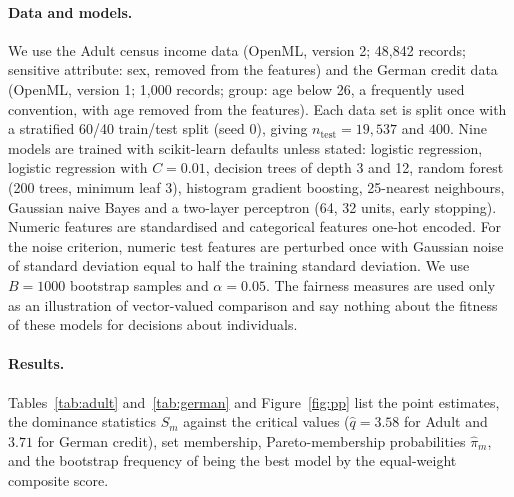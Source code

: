 \documentclass[11pt,a4paper]{article}
\begin{document}
\paragraph{Data and models.} We use the Adult census income data (OpenML, version 2; 48,842 records; sensitive attribute: sex, removed from the features) and the German credit data (OpenML, version 1; 1,000 records; group: age below 26, a frequently used convention, with age removed from the features). Each data set is split once with a stratified 60/40 train/test split (seed 0), giving $n_{\text{test}}=19{,}537$ and $400$. Nine models are trained with scikit-learn defaults unless stated: logistic regression, logistic regression with $C=0.01$, decision trees of depth 3 and 12, random forest (200 trees, minimum leaf 3), histogram gradient boosting, 25-nearest neighbours, Gaussian naive Bayes and a two-layer perceptron (64, 32 units, early stopping). Numeric features are standardised and categorical features one-hot encoded. For the noise criterion, numeric test features are perturbed once with Gaussian noise of standard deviation equal to half the training standard deviation. We use $B=1000$ bootstrap samples and $\alpha=0.05$. The fairness measures are used only as an illustration of vector-valued comparison and say nothing about the fitness of these models for decisions about individuals.

\paragraph{Results.} Tables~\ref{tab:adult} and~\ref{tab:german} and Figure~\ref{fig:pp} list the point estimates, the dominance statistics $S_m$ against the critical values ($\hat q=3.58$ for Adult and $3.71$ for German credit), set membership, Pareto-membership probabilities $\hat\pi_m$, and the bootstrap frequency of being the best model by the equal-weight composite score.

\begin{table}[h]\centering\small
\caption{Adult (sex), $n_{\text{test}}=19{,}537$. $S_m$: dominance statistic (critical value 3.58). Naive: on the Pareto front of the point estimates. $\hat\pi_m$: bootstrap probability of Pareto-front membership. Top-1: bootstrap frequency of minimising the composite score.}\label{tab:adult}

\end{table}
\begin{table}[h]\centering\small
\caption{German credit (age), $n_{\text{test}}=400$. Critical value 3.71.}\label{tab:german}

\end{table}
\end{document}
